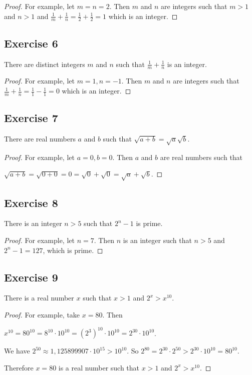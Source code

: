 \documentclass[14pt]{extarticle}
\begin{document}
\begin{proof}
    For example, let $m = n = 2$. Then $m$ and $n$ are integers such that $m > 1$ and $n > 1$ and $\frac{1}{m} + \frac{1}{n} = \frac{1}{2} + \frac{1}{2} = 1$ which is an integer.
\end{proof}

\subsection{Exercise 6}
There are distinct integers $m$ and $n$ such that $\frac{1}{m} + \frac{1}{n}$ is an integer.

\begin{proof}
    For example, let $m = 1, n = -1$. Then $m$ and $n$ are integers such that $\frac{1}{m} + \frac{1}{n} = \frac{1}{1} - \frac{1}{1} = 0$ which is an integer.
\end{proof}

\subsection{Exercise 7}
There are real numbers $a$ and $b$ such that $\sqrt{a+b} = \sqrt{a} \sqrt{b}$.

\begin{proof}
    For example, let $a = 0, b = 0$. Then $a$ and $b$ are real numbers such that

    $\sqrt{a+b} = \sqrt{0+0} = 0 = \sqrt{0} + \sqrt{0} = \sqrt{a} + \sqrt{b}$.
\end{proof}

\subsection{Exercise 8}
There is an integer $n > 5$ such that $2^n - 1$ is prime.

\begin{proof}
    For example, let $n = 7$. Then $n$ is an integer such that
    $n > 5$ and $2^n - 1 = 127$, which is prime.
\end{proof}

\subsection{Exercise 9}
There is a real number $x$ such that $x > 1$ and $2^x > x^{10}$.

\begin{proof}
    For example, take $x = 80$. Then

    $x^{10} = 80^{10} = 8^{10} \cdot 10^{10} = (2^3)^{10} \cdot 10^{10} = 2^{30} \cdot 10^{10}$.

    We have $2^{50} \approx 1,125899907 \cdot 10^{15} > 10^{10}$. So $2^{80} = 2^{30} \cdot 2^{50} > 2^{30} \cdot 10^{10} = 80^{10}$.

    Therefore $x = 80$ is a real number such that $x > 1$ and $2^x > x^{10}$.
\end{proof}
\end{document}
